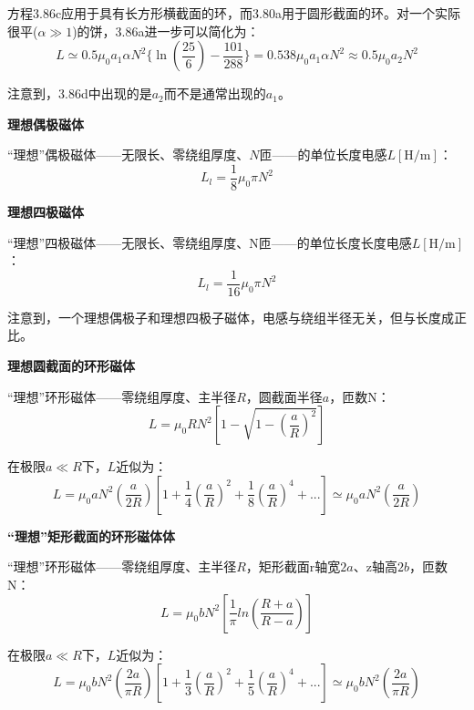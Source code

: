 方程3.86c应用于具有长方形横截面的环，而3.80a用于圆形截面的环。对一个实际很平($\alpha\gg 1$)的饼，3.86a进一步可以简化为：
\begin{equation*}
L  \simeq  0.5\mu_0a_1\alpha N^2\{\ln(\frac{25}{6})-\frac{101}{288}\}=0.538\mu_0a_1\alpha N^2\approx 0.5\mu_0a_2N^2 \tag{3.86'''}%
\end{equation*}

注意到，3.86d中出现的是$a_2$而不是通常出现的$a_1$。

\textbf{理想偶极磁体}

  “理想”偶极磁体——无限长、零绕组厚度、$N$匝——的单位长度电感$L\mathrm{[H/m]}$：
\begin{equation}
L_l=\frac{1}{8}\mu_0\pi N^2%
\end{equation}

\textbf{理想四极磁体}

  “理想”四极磁体——无限长、零绕组厚度、N匝——的单位长度长度电感$L\mathrm{[H/m]}$：
  \begin{equation}
L_l=\frac{1}{16}\mu_0\pi N^2%
\end{equation}

注意到，一个理想偶极子和理想四极子磁体，电感与绕组半径无关，但与长度成正比。

\textbf{理想圆截面的环形磁体}

  “理想”环形磁体——零绕组厚度、主半径$R$，圆截面半径$a$，匝数N：
  \begin{equation}
 L=\mu_0RN^2[1-\sqrt{1-(\frac{a}{R})^2}]%
\end{equation}

在极限$a\ll R$下，$L$近似为：
\begin{equation*}
 L=\mu_0aN^2(\frac{a}{2R})[1+\frac{1}{4}(\frac{a}{R})^2+\frac{1}{8}(\frac{a}{R})^4+...]\simeq\mu_0aN^2(\frac{a}{2R}) \tag{3.89'}%
\end{equation*}

\textbf{“理想”矩形截面的环形磁体体}

“理想”环形磁体——零绕组厚度、主半径$R$，矩形截面r轴宽$2a$、z轴高$2b$，匝数N：
  \begin{equation}
L=\mu_0bN^2[\frac{1}{\pi}ln(\frac{R+a}{R-a})]%
\end{equation}

在极限$a\ll R$下，$L$近似为：
\begin{equation*}
L=\mu_0bN^2(\frac{2a}{\pi R})[1+\frac{1}{3}(\frac{a}{R})^2+\frac{1}{5}(\frac{a}{R})^4+...]\simeq\mu_0bN^2(\frac{2a}{\pi R}) \tag{3.90'}%
\end{equation*}



